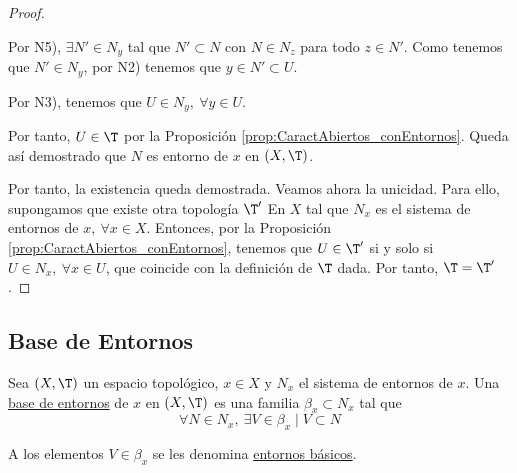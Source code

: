 \begin{proof}
\begin{description}
        Por N5), $\exists N'\in N_y$ tal que $N'\subset N$ con $N\in N_z$ para todo $z\in N'$. Como tenemos que $N'\in N_y$, por N2) tenemos que $y\in N'\subset U$.
        
        Por N3), tenemos que $U\in N_y,~\forall y\in U$.
        
        Por tanto, $U\in \T$ por la Proposición \ref{prop:CaractAbiertos_conEntornos}. Queda así demostrado que $N$ es entorno de $x$ en $(X,\T)$.
    \end{description}

    Por tanto, la existencia queda demostrada. Veamos ahora la unicidad. Para ello, supongamos que existe otra topología $\T'$ En $X$ tal que $N_x$ es el sistema de entornos de $x, ~\forall x\in X$. Entonces, por la Proposición \ref{prop:CaractAbiertos_conEntornos}, tenemos que $U\in \T'$ si y solo si $U\in N_x,~\forall x\in U$, que coincide con la definición de $\T$ dada. Por tanto, $\T=\T'$.
\end{proof}

\subsection{Base de Entornos}
\begin{definicion}
    Sea $(X,\T)$ un espacio topológico, $x\in X$ y $N_x$ el sistema de entornos de $x$. Una \ul{base de entornos} de $x$ en $(X,\T)$ es una familia $\beta_x\subset N_x$ tal que 
    $$\forall N\in N_x,~\exists V\in \beta_x \mid V\subset N$$

    A los elementos $V\in \beta_x$ se les denomina \ul{entornos básicos}.
\end{definicion}


